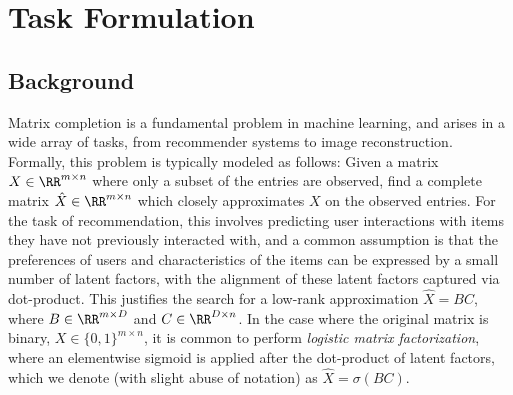 \section{Task Formulation}
\subsection{Background}
Matrix completion is a fundamental problem in machine learning, and arises in a wide array of tasks, from recommender systems to image reconstruction. %
Formally, this problem is typically modeled as follows: Given a matrix $X \in \RR^{m \times n}$ where only a subset of the entries are observed, find a complete matrix $\hat X \in \RR^{m \times n}$ which closely approximates $X$ on the observed entries. 
For the task of recommendation, this involves predicting user interactions with items they have not previously interacted with, and a common assumption is that the preferences of users and characteristics of the items can be expressed by a small number of latent factors, with the alignment of these latent factors captured via dot-product. This justifies the search for a low-rank approximation $\hat X = BC$, where $B \in \RR^{m \times D}$ and $C \in \RR^{D \times n}$. In the case where the original matrix is binary, $X \in \{0,1\}^{m \times n}$, it is common to perform \emph{logistic matrix factorization}, where an elementwise sigmoid is applied after the dot-product of latent factors, which we denote (with slight abuse of notation) as $\hat X = \sigma(BC)$. \\


